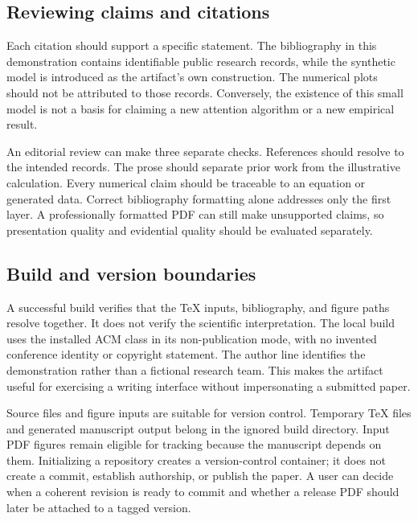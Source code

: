 \subsection{Reviewing claims and citations}
Each citation should support a specific statement. The bibliography in this demonstration contains identifiable public research records, while the synthetic model is introduced as the artifact's own construction. The numerical plots should not be attributed to those records. Conversely, the existence of this small model is not a basis for claiming a new attention algorithm or a new empirical result.

An editorial review can make three separate checks. References should resolve to the intended records. The prose should separate prior work from the illustrative calculation. Every numerical claim should be traceable to an equation or generated data. Correct bibliography formatting alone addresses only the first layer. A professionally formatted PDF can still make unsupported claims, so presentation quality and evidential quality should be evaluated separately.

\subsection{Build and version boundaries}
A successful build verifies that the TeX inputs, bibliography, and figure paths resolve together. It does not verify the scientific interpretation. The local build uses the installed ACM class in its non-publication mode, with no invented conference identity or copyright statement. The author line identifies the demonstration rather than a fictional research team. This makes the artifact useful for exercising a writing interface without impersonating a submitted paper.

Source files and figure inputs are suitable for version control. Temporary TeX files and generated manuscript output belong in the ignored build directory. Input PDF figures remain eligible for tracking because the manuscript depends on them. Initializing a repository creates a version-control container; it does not create a commit, establish authorship, or publish the paper. A user can decide when a coherent revision is ready to commit and whether a release PDF should later be attached to a tagged version.
